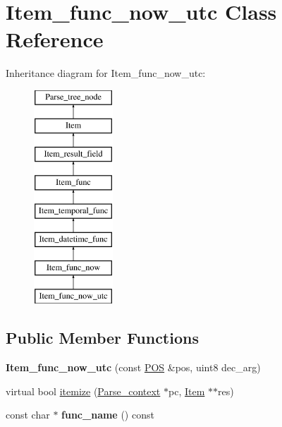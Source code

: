 \hypertarget{classItem__func__now__utc}{}\section{Item\+\_\+func\+\_\+now\+\_\+utc Class Reference}
\label{classItem__func__now__utc}
Inheritance diagram for Item\+\_\+func\+\_\+now\+\_\+utc\+:\begin{figure}[H]
\begin{center}
\leavevmode
\includegraphics[height=8.000000cm]{classItem__func__now__utc}
\end{center}
\end{figure}
\subsection*{Public Member Functions}
\begin{DoxyCompactItemize}
\item 
\mbox{\label{classItem__func__now__utc_a1b354689ce7cb417edbb20d992c2be5d}} 
{\bfseries Item\+\_\+func\+\_\+now\+\_\+utc} (const \mbox{\hyperlink{structYYLTYPE}{P\+OS}} \&pos, uint8 dec\+\_\+arg)
\item 
virtual bool \mbox{\hyperlink{classItem__func__now__utc_ac48fbe69e363d5a82f3debc0c90eb8c6}{itemize}} (\mbox{\hyperlink{structParse__context}{Parse\+\_\+context}} $\ast$pc, \mbox{\hyperlink{classItem}{Item}} $\ast$$\ast$res)
\item 
\mbox{\label{classItem__func__now__utc_a47729bd68eafc49f4de08feb8d2bc9a9}} 
const char $\ast$ {\bfseries func\+\_\+name} () const
\end{DoxyCompactItemize}
